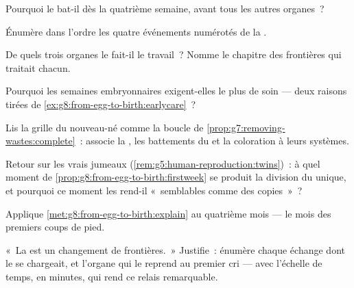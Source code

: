 \begin{exercise}[$\star$]\label{exo:g8:from-egg-to-birth:5}
Pourquoi le  bat-il dès la quatrième semaine, avant tous les
autres organes~?
\end{exercise}

\begin{exercise}[$\star$]\label{exo:g8:from-egg-to-birth:6}
Énumère dans l'ordre les quatre événements numérotés de la
.
\end{exercise}

\begin{exercise}[$\star\star$]\label{exo:g8:from-egg-to-birth:7}
De quels trois organes le  fait-il le travail~? Nomme le
chapitre des frontières qui traitait chacun.
\end{exercise}

\begin{exercise}[$\star\star$]\label{exo:g8:from-egg-to-birth:8}
Pourquoi les semaines embryonnaires exigent-elles le plus de soin
--- deux raisons tirées de \cref{ex:g8:from-egg-to-birth:earlycare}~?
\end{exercise}

\begin{exercise}[$\star\star$]\label{exo:g8:from-egg-to-birth:9}
Lis la grille du nouveau-né comme la boucle de
\cref{prop:g7:removing-wastes:complete}~: associe la ,
les battements du  et la coloration à leurs systèmes.
\end{exercise}

\begin{exercise}[$\star\star$]\label{exo:g8:from-egg-to-birth:10}
Retour sur les vrais jumeaux
(\cref{rem:g5:human-reproduction:twins})~: à quel moment de
\cref{prop:g8:from-egg-to-birth:firstweek} se produit la division du
 unique, et pourquoi ce moment les rend-il «~semblables comme
des copies~»~?
\end{exercise}

\begin{exercise}[$\star\star$]\label{exo:g8:from-egg-to-birth:11}
Applique \cref{met:g8:from-egg-to-birth:explain} au quatrième mois
--- le mois des premiers coups de pied.
\end{exercise}

\begin{exercise}[$\star\star\star$]\label{exo:g8:from-egg-to-birth:12}
«~La  est un changement de frontières.~» Justifie~:
énumère chaque échange dont le  se chargeait, et l'organe
qui le reprend au premier cri --- avec l'échelle de temps, en
minutes, qui rend ce relais remarquable.
\end{exercise}

